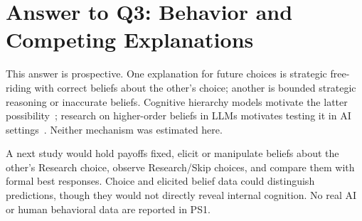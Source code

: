 \section{Answer to Q3: Behavior and Competing Explanations}
This answer is prospective. One explanation for future choices is strategic free-riding with correct beliefs about the other's choice; another is bounded strategic reasoning or inaccurate beliefs. Cognitive hierarchy models motivate the latter possibility~\cite{camerer2004}; research on higher-order beliefs in LLMs motivates testing it in AI settings~\cite{zhang2025}. Neither mechanism was estimated here.

A next study would hold payoffs fixed, elicit or manipulate beliefs about the other's Research choice, observe Research/Skip choices, and compare them with formal best responses. Choice and elicited belief data could distinguish predictions, though they would not directly reveal internal cognition. No real AI or human behavioral data are reported in PS1.

